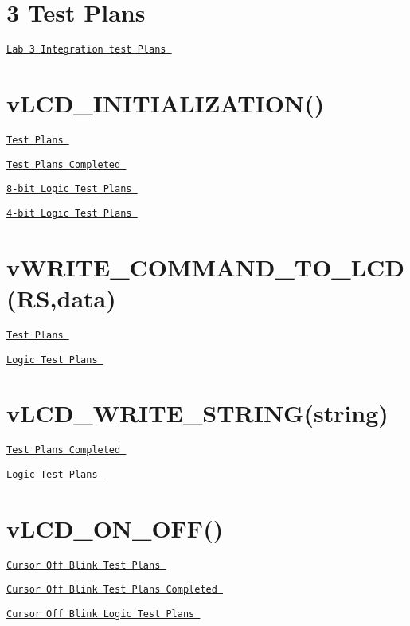 \hypertarget{_test_plans_Lab}{}\section{3 Test Plans}\label{_test_plans_Lab}
\href{LAB3_TEST_PLANS.pdf}{\tt Lab 3 Integration test Plans }\hypertarget{_test_plans_initialization}{}\section{v\-L\-C\-D\-\_\-\-I\-N\-I\-T\-I\-A\-L\-I\-Z\-A\-T\-I\-O\-N()}\label{_test_plans_initialization}
\href{vLCD_INITIALIZATION_TESTPLAN.pdf}{\tt Test Plans } \par
 \href{vLCD_INITIALIZATION_TESTPLAN_COMPLETE.pdf}{\tt Test Plans Completed } \par
 \href{vLCD_INITIALIZATION_8bit_LOGIC.pdf}{\tt 8-\/bit Logic Test Plans } \par
 \href{vLCD_INITIALIZATION_4bit_LOGIC.pdf}{\tt 4-\/bit Logic Test Plans }\hypertarget{_test_plans_command}{}\section{v\-W\-R\-I\-T\-E\-\_\-\-C\-O\-M\-M\-A\-N\-D\-\_\-\-T\-O\-\_\-\-L\-C\-D(\-R\-S,data)}\label{_test_plans_command}
\href{vWRITE_COMMAND_TO_LCD_TESTPLAN.pdf}{\tt Test Plans } \par
 \href{vWRITE_COMMAND_TO_LCD_LOGIC.pdf}{\tt Logic Test Plans }\hypertarget{_test_plans_string}{}\section{v\-L\-C\-D\-\_\-\-W\-R\-I\-T\-E\-\_\-\-S\-T\-R\-I\-N\-G(string)}\label{_test_plans_string}
\href{vLCD_PRINT_STRING_TESTPLAN.pdf}{\tt Test Plans Completed } \par
 \href{vLCD_PRINT_STRING_LOGIC.pdf}{\tt Logic Test Plans }\hypertarget{_test_plans_onoff}{}\section{v\-L\-C\-D\-\_\-\-O\-N\-\_\-\-O\-F\-F()}\label{_test_plans_onoff}
\href{vLCD_ON_OFF_CURSOR_OFF_BLINK_TESTPLAN.pdf}{\tt Cursor Off Blink Test Plans } \par
 \href{vLCD_ON_OFF_CURSOR_OFF_BLINK_TESTPLAN_COMPLETE.pdf}{\tt Cursor Off Blink Test Plans Completed } \par
 \href{vLCD_ON_OFF_CURSOR_OFF_BLINK_LOGIC.pdf}{\tt Cursor Off Blink Logic Test Plans } \par
